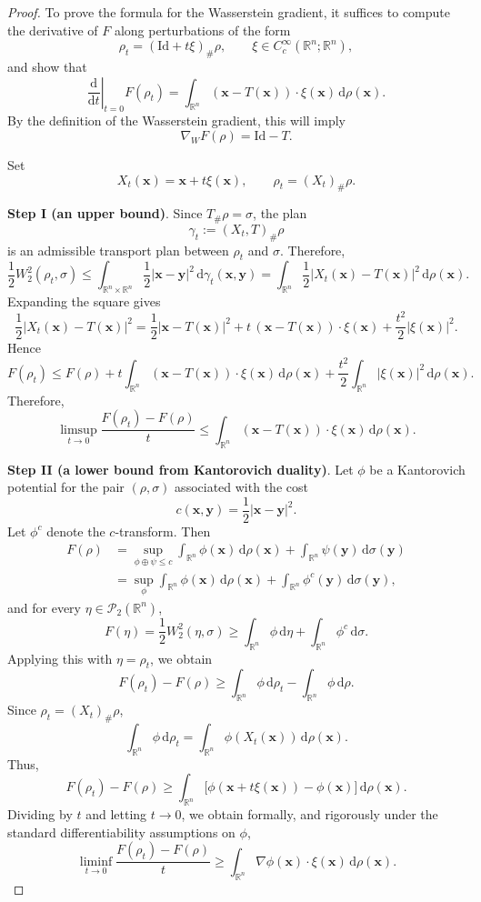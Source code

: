 \documentclass[11pt]{book}
\newcommand{\R}{\mathbb{R}}
\newcommand{\bx}{\mathbf x}
\newcommand{\by}{\mathbf y}
\newcommand{\id}{\mathrm{Id}}
\newcommand{\dd}{\mathrm{d}}
\newcommand{\gradw}{\nabla_{\!W}}
\begin{document}
\begin{proof}
To prove the formula for the Wasserstein gradient, it suffices to compute the derivative of $F$ along perturbations of the form
\[
\rho_t = (\id + t\xi)_\#\rho,
\qquad \xi\in C_c^{\infty}(\R^n;\R^n),
\]
and show that
\[
\left.\frac{\dd}{\dd t}\right|_{t=0} F(\rho_t)
=
\int_{\R^n} (\bx-T(\bx))\cdot \xi(\bx)\,\dd\rho(\bx).
\]
By the definition of the Wasserstein gradient, this will imply
\[
\gradw F(\rho)=\id-T.
\]

Set
\[
X_t(\bx)=\bx+t\xi(\bx),
\qquad \rho_t=(X_t)_\#\rho.
\]

\medskip
\noindent
{\bf Step I (an upper bound)}.
Since $T_\#\rho=\sigma$, the plan
\[
\gamma_t := (X_t,T)_\#\rho
\]
is an admissible transport plan between $\rho_t$ and $\sigma$. Therefore,
\[
\frac12 W_2^2(\rho_t,\sigma)
\le
\int_{\R^n\times\R^n} \frac12 |\bx-\by|^2\,\dd\gamma_t(\bx,\by)
=
\int_{\R^n} \frac12 |X_t(\bx)-T(\bx)|^2\,\dd\rho(\bx).
\]
Expanding the square gives
\[
\frac12 |X_t(\bx)-T(\bx)|^2
=
\frac12 |\bx-T(\bx)|^2
+
t\,(\bx-T(\bx))\cdot \xi(\bx)
+
\frac{t^2}{2}|\xi(\bx)|^2.
\]
Hence
\[
F(\rho_t)
\le
F(\rho)
+
t\int_{\R^n} (\bx-T(\bx))\cdot \xi(\bx)\,\dd\rho(\bx)
+
\frac{t^2}{2}\int_{\R^n}|\xi(\bx)|^2\,\dd\rho(\bx).
\]
Therefore,
\begin{equation}\label{eq:upperbound}
\limsup_{t\to 0}
\frac{F(\rho_t)-F(\rho)}{t}
\le
\int_{\R^n} (\bx-T(\bx))\cdot \xi(\bx)\,\dd\rho(\bx).
\end{equation}

\medskip
\noindent
{\bf Step II (a lower bound from Kantorovich duality)}.
Let $\phi$ be a Kantorovich potential for the pair $(\rho,\sigma)$ associated with the cost
\[
c(\bx,\by)=\frac12|\bx-\by|^2.
\]
Let $\phi^c$ denote the $c$-transform. Then
\begin{align*}
F(\rho) &=  \sup_{\phi\oplus\psi\le c} \int_{\R^n} \phi(\bx)\,\dd\rho(\bx) + \int_{\R^n} \psi(\by)\,\dd\sigma(\by) \\
&= \sup_{\phi} \int_{\R^n} \phi(\bx)\,\dd\rho(\bx) + \int_{\R^n} \phi^c(\by)\,\dd\sigma(\by),
\end{align*}
and for every $\eta\in\mathcal P_2(\R^n)$,
\[
F(\eta)=\frac12 W_2^2(\eta,\sigma)
\ge
\int_{\R^n}\phi\,\dd\eta + \int_{\R^n}\phi^c\,\dd\sigma.
\]
Applying this with $\eta=\rho_t$, we obtain
\[
F(\rho_t)-F(\rho)
\ge
\int_{\R^n}\phi\,\dd\rho_t - \int_{\R^n}\phi\,\dd\rho.
\]
Since $\rho_t=(X_t)_\#\rho$,
\[
\int_{\R^n}\phi\,\dd\rho_t
=
\int_{\R^n} \phi(X_t(\bx))\,\dd\rho(\bx).
\]
Thus,
\[
F(\rho_t)-F(\rho)
\ge
\int_{\R^n}\bigl[\phi(\bx+t\xi(\bx)) - \phi(\bx)\bigr] \,\dd\rho(\bx).
\]
Dividing by $t$ and letting $t\to 0$, we obtain formally, and rigorously under the standard differentiability assumptions on $\phi$,
\begin{equation}\label{eq:lowerbound1}
\liminf_{t\to 0}
\frac{F(\rho_t)-F(\rho)}{t}
\ge
\int_{\R^n} \nabla\phi(\bx)\cdot \xi(\bx)\,\dd\rho(\bx).
\end{equation}


\end{proof}
\end{document}
